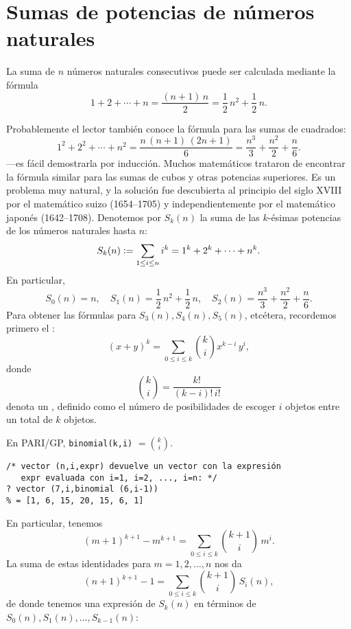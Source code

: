 \documentclass{article}
\numberwithin{equation}{section}
\theoremstyle{definition}
\begin{document}
\pagebreak
\tableofcontents


\pagebreak
\section{Sumas de potencias de números naturales}
\label{sumas-de-potencias}

La suma de $n$ números naturales consecutivos puede ser calculada mediante la
fórmula
$$1+2+\cdots+n = \frac{(n+1)\,n}{2} = \frac{1}{2}\,n^2 + \frac{1}{2}\,n.$$

Probablemente el lector también conoce la fórmula para las sumas de cuadrados:
$$1^2 + 2^2 + \cdots + n^2 = \frac{n\,(n+1)\,(2n + 1)}{6} = \frac{n^3}{3} + \frac{n^2}{2} + \frac{n}{6}.$$
---es fácil demostrarla por inducción. Muchos matemáticos trataron de encontrar
la fórmula similar para las sumas de cubos y otras potencias superiores.
Es un problema muy natural, y la solución fue descubierta al principio del siglo
XVIII por el matemático suizo  (1654--1705) y
independientemente por el matemático japonés 
(1642--1708). Denotemos por $S_k (n)$ la suma de las $k$-ésimas potencias de los
números naturales hasta $n$:
$$S_k (n) \mathrel{\mathop:}= \sum_{1 \le i \le n} i^k = 1^k + 2^k + \cdots + n^k.$$
En particular,
\[ S_0 (n) = n, \quad
  S_1 (n) = \frac{1}{2}\,n^2 + \frac{1}{2}\,n, \quad
  S_2 (n) = \frac{n^3}{3} + \frac{n^2}{2} + \frac{n}{6}. \]
Para obtener las fórmulas para $S_3 (n), S_4 (n), S_5 (n)$, etcétera, recordemos
primero el :
$$(x+y)^k = \sum_{0 \le i \le k} {k \choose i} x^{k-i}\,y^i,$$
donde
$${k \choose i} = \frac{k!}{(k-i)!\,i!}$$
denota un , definido como el número de posibilidades
de escoger $i$ objetos entre un total de $k$ objetos.

\begin{shaded}
  \small\noindent En PARI/GP, \verb|binomial(k,i)| $= {k\choose i}$.

\begin{verbatim}
/* vector (n,i,expr) devuelve un vector con la expresión
   expr evaluada con i=1, i=2, ..., i=n: */
? vector (7,i,binomial (6,i-1))
% = [1, 6, 15, 20, 15, 6, 1]
\end{verbatim}
\end{shaded}

En particular, tenemos
$$(m+1)^{k+1} - m^{k+1} = \sum_{0 \le i \le k} {k+1 \choose i}\,m^i.$$
La suma de estas identidades para $m = 1, 2, \ldots, n$ nos da
$$(n+1)^{k+1} - 1 = \sum_{0 \le i \le k} {k+1 \choose i}\,S_i (n),$$
de donde tenemos una expresión de $S_k (n)$ en términos de
$S_0 (n), S_1 (n), \ldots, S_{k-1} (n)$:
\end{document}
